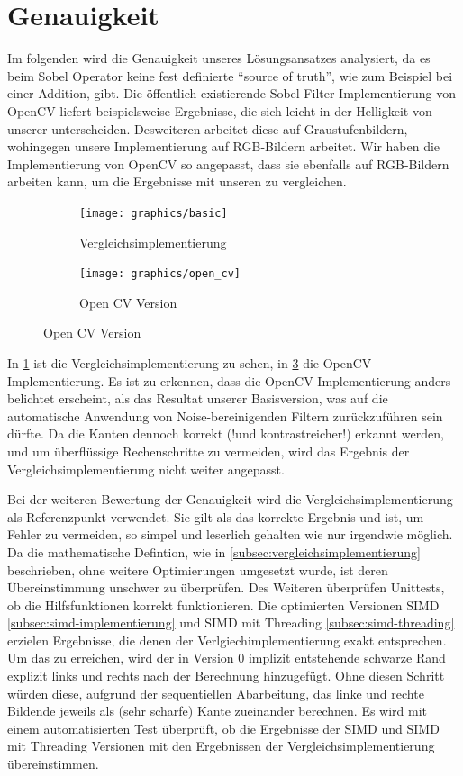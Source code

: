\documentclass[course=erap]{aspdoc}
\begin{document}
\section{Genauigkeit}\label{sec:genauigkeit}
Im folgenden wird die Genauigkeit unseres Lösungsansatzes analysiert, da es beim Sobel Operator keine fest definierte \enquote{source of truth}, wie zum Beispiel bei einer Addition, gibt.
Die öffentlich existierende Sobel-Filter Implementierung von OpenCV liefert beispielsweise Ergebnisse, die sich leicht in der Helligkeit von unserer unterscheiden.
Desweiteren arbeitet diese auf Graustufenbildern, wohingegen unsere Implementierung auf RGB-Bildern arbeitet.
Wir haben die Implementierung von OpenCV\cite{opencvsobel} so angepasst, dass sie ebenfalls auf RGB-Bildern arbeiten kann, um die Ergebnisse mit unseren zu vergleichen.
\begin{figure}[H]
    \begin{subfigure}{.5\columnwidth}
        \centering
        \texttt{[image: graphics/basic]}
        \caption{Vergleichsimplementierung}
        \label{fig:basic}
    \end{subfigure}
    \begin{subfigure}{.5\columnwidth}
        \centering
        \texttt{[image: graphics/open\_cv]}
        \caption{Open CV Version}
        \label{fig:opencv}
    \end{subfigure}
\end{figure}
In \ref{fig:basic} ist die Vergleichsimplementierung zu sehen, in \ref{fig:opencv} die OpenCV Implementierung.
Es ist zu erkennen, dass die OpenCV Implementierung anders belichtet erscheint, als das Resultat unserer Basisversion, was auf die automatische Anwendung von Noise-bereinigenden Filtern zurückzuführen sein dürfte.
Da die Kanten dennoch korrekt (!und kontrastreicher!) erkannt werden, und um überflüssige Rechenschritte zu vermeiden, wird das Ergebnis der Vergleichsimplementierung nicht weiter angepasst.

Bei der weiteren Bewertung der Genauigkeit wird die Vergleichsimplementierung als Referenzpunkt verwendet.
Sie gilt als das korrekte Ergebnis und ist, um Fehler zu vermeiden, so simpel und leserlich gehalten wie nur irgendwie möglich.
Da die mathematische Defintion, wie in \ref{subsec:vergleichsimplementierung} beschrieben, ohne weitere Optimierungen umgesetzt wurde, ist deren Übereinstimmung unschwer zu überprüfen.
Des Weiteren überprüfen Unittests, ob die Hilfsfunktionen korrekt funktionieren.
Die optimierten Versionen SIMD \ref{subsec:simd-implementierung} und SIMD mit Threading \ref{subsec:simd-threading} erzielen Ergebnisse, die denen der Verlgiechimplementierung exakt entsprechen.
Um das zu erreichen, wird der in Version 0 implizit entstehende schwarze Rand explizit links und rechts nach der Berechnung hinzugefügt.
Ohne diesen Schritt würden diese, aufgrund der sequentiellen Abarbeitung, das linke und rechte Bildende jeweils als (sehr scharfe) Kante zueinander berechnen.
Es wird mit einem automatisierten Test überprüft, ob die Ergebnisse der SIMD und SIMD mit Threading Versionen mit den Ergebnissen der Vergleichsimplementierung übereinstimmen.
\end{document}

